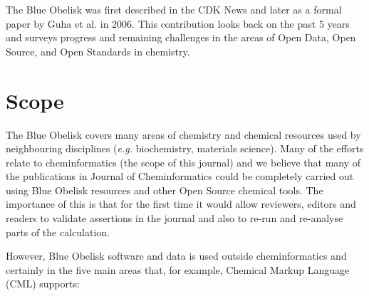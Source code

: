 \documentclass[10pt]{bmc_article}
\newenvironment{bmcformat}{\fussy\setboolean{publ}{true}}{\fussy}
\begin{document}
\begin{bmcformat}
The Blue Obelisk was first described in the CDK News \cite{CDKNewsBO} and
later as a formal paper by Guha et al.\cite{Guha2006} in
2006. This contribution looks back on the past 5 years and surveys
progress and remaining challenges in the areas of Open Data, Open
Source, and Open Standards in chemistry.


\section*{Scope}
The Blue Obelisk covers many areas of chemistry and chemical resources
used by neighbouring disciplines ({\it e.g.} biochemistry, materials
science). Many of the efforts relate to cheminformatics (the scope of
this journal) and we believe that many of the publications in Journal of
Cheminformatics could be completely carried out using Blue Obelisk resources
and other Open Source chemical tools. The importance of this is that for the
first time it would allow reviewers, editors and readers to validate
assertions in the journal and also to re-run and re-analyse parts of
the calculation.

However, Blue Obelisk software and data is used outside
cheminformatics and certainly in the five main areas that, for
example, Chemical Markup Language (CML) \cite{murray-rust_chemical_1999} supports:


\end{bmcformat}
\end{document}
